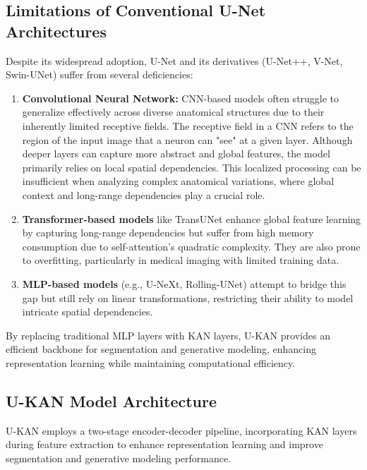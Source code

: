 \documentclass[conference]{IEEEtran}
\begin{document}
\subsection{Limitations of Conventional U-Net Architectures}
Despite its widespread adoption, U-Net and its derivatives (U-Net++, V-Net,
Swin-UNet) suffer from several deficiencies:

\setlength{\parskip}{0pt}
\begin{enumerate}[label=\arabic*.] %
    \item \textbf{Convolutional Neural Network:} CNN-based models often struggle to generalize effectively across diverse anatomical structures due to their inherently limited receptive fields. The receptive field in a CNN refers to the region of the input image that a neuron can "see" at a given layer. Although deeper layers can capture more abstract and global features, the model primarily relies on local spatial dependencies. This localized processing can be insufficient when analyzing complex anatomical variations, where global context and long-range dependencies play a crucial role.
    \item \textbf{Transformer-based models} like TransUNet enhance global feature learning by capturing long-range dependencies but suffer from high memory consumption due to self-attention's quadratic complexity. They are also prone to overfitting, particularly in medical imaging with limited training data.
    \item \textbf{MLP-based models}  (e.g., U-NeXt, Rolling-UNet) attempt to bridge this gap but still rely on linear transformations, restricting their ability to model intricate spatial dependencies.
\end{enumerate}

By replacing traditional MLP layers with KAN layers, U-KAN provides an
efficient backbone for segmentation and generative modeling, enhancing
representation learning while maintaining computational efficiency.

\subsection{U-KAN Model Architecture}
U-KAN employs a two-stage encoder-decoder pipeline, incorporating KAN layers
during feature extraction to enhance representation learning and improve
segmentation and generative modeling performance.
\end{document}

